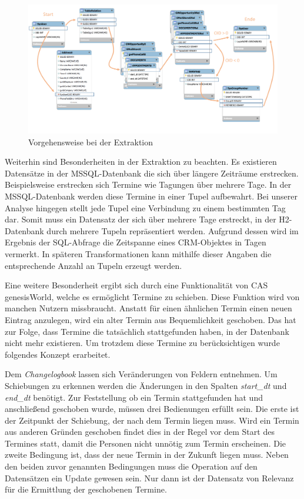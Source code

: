 \begin{figure}[htbp]
\centering
  \includegraphics[width=1.0\textwidth]{pics/konzept_extraktion.pdf}
\caption{Vorgehensweise bei der Extraktion}
\label{konzept_extract}
\end{figure} 


Weiterhin sind Besonderheiten in der Extraktion zu beachten. Es existieren Datensätze in der MSSQL-Datenbank die sich über längere Zeiträume erstrecken. Beispielsweise erstrecken sich Termine wie Tagungen über mehrere Tage. In der MSSQL-Datenbank werden diese Termine in einer Tupel aufbewahrt. Bei unserer Analyse hingegen stellt jede Tupel eine Verbindung zu einem bestimmten Tag dar. Somit muss ein Datensatz der sich über mehrere Tage erstreckt, in der H2-Datenbank durch mehrere Tupeln repräsentiert werden. Aufgrund dessen wird im Ergebnis der SQL-Abfrage die Zeitspanne eines CRM-Objektes in Tagen vermerkt. In späteren Transformationen kann mithilfe dieser Angaben die entsprechende Anzahl an Tupeln erzeugt werden.

Eine weitere Besonderheit ergibt sich durch eine Funktionalität von CAS genesisWorld, welche es ermöglicht Termine zu schieben. Diese Funktion wird von manchen Nutzern missbraucht. Anstatt für einen ähnlichen Termin einen neuen Eintrag anzulegen, wird ein alter Termin aus Bequemlichkeit geschoben. Das hat zur Folge, dass Termine die tatsächlich stattgefunden haben, in der Datenbank nicht mehr existieren. Um trotzdem diese Termine zu berücksichtigen wurde folgendes Konzept erarbeitet. 

Dem \textit{Changelogbook} lassen sich Veränderungen von Feldern entnehmen. Um Schiebungen zu erkennen werden die Änderungen in den Spalten \textit{start\_dt} und \textit{end\_dt} benötigt. Zur Feststellung ob ein Termin stattgefunden hat und anschließend geschoben wurde, müssen drei Bedienungen erfüllt sein. Die erste ist der Zeitpunkt der Schiebung, der nach dem Termin liegen muss. Wird ein Termin aus anderen Gründen geschoben findet dies in der Regel vor dem Start des Termines statt, damit die Personen nicht unnötig zum Termin erscheinen. Die zweite Bedingung ist, dass der neue Termin in der Zukunft liegen muss. Neben den beiden zuvor genannten Bedingungen muss die Operation auf den Datensätzen ein Update gewesen sein. Nur dann ist der Datensatz von Relevanz für die Ermittlung der geschobenen Termine. 

